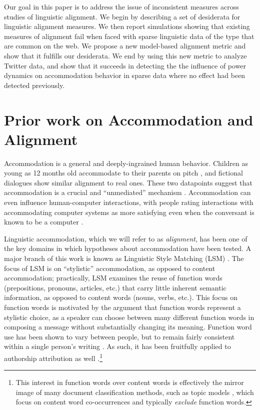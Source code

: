 \documentclass{acm_proc_article-sp}
\begin{document}
Our goal in this paper is to address the issue of inconsistent measures across studies of linguistic alignment. We begin by describing a set of desiderata for linguistic alignment measures. We then report simulations showing that existing measures of alignment fail when faced with sparse linguistic data of the type that are common on the web. We propose a new model-based alignment metric and show that it fulfills our desiderata. We end by using this new metric to analyze Twitter data, and show that it succeeds in detecting the the influence of power dynamics on accommodation behavior in sparse data where no effect had been detected previously. 

\section{Prior work on Accommodation and Alignment}

Accommodation is a general and deeply-ingrained human behavior.  Children as young as 12 months old accommodate to their parents on pitch \cite{Lieberman1967}, and fictional dialogues show similar alignment to real ones. These two datapoints suggest that accommodation is a crucial and ``unmediated'' mechanism \cite{PickeringGarrod2004,DNMLee2011}.  Accommodation can even influence human-computer interactions, with people rating interactions with accommodating computer systems as more satisfying even when the conversant is known to be a computer \cite{NassLee2000,vanBaarenEtAl2003,BraniganEtAl2010}.

Linguistic accommodation, which we will refer to as \emph{alignment}, has been one of the key domains in which hypotheses about accommodation have been tested. A major branch of this work is known as Linguistic Style Matching (LSM) \cite{NiederhofferPennebaker2002,IrelandEtAl2011}. The focus of LSM is on ``stylistic'' accommodation, as opposed to content accommodation; practically, LSM examines the reuse of function words (prepositions, pronouns, articles, etc.) that carry little inherent semantic information, as opposed to content words (nouns, verbs, etc.). This focus on function words is motivated by the argument that function words represent a stylistic choice, as a speaker can choose between many different function words in composing a message without substantially changing its meaning.  Function word use has been shown to vary between people, but to remain fairly consistent within a single person's writing \cite{PennebakerKing1999}. As such, it has been fruitfully applied to authorship attribution as well \cite{boyd2015}.\footnote{This interest in function words over content words is effectively the mirror image of many document classification methods, such as topic models \cite{BleiNgJordan2003}, which focus on content word co-occurrences and typically \emph{exclude} function words.}
\end{document}
